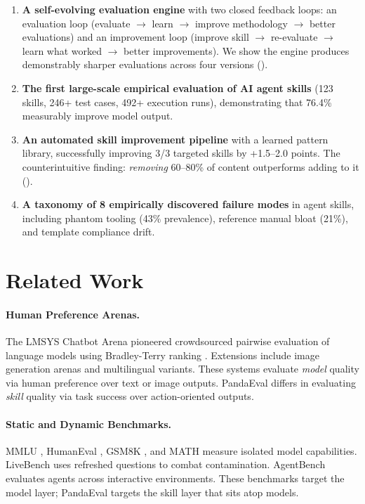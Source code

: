 \documentclass[11pt,a4paper]{article}
\begin{document}
\begin{enumerate}[leftmargin=*]
    \item \textbf{A self-evolving evaluation engine} with two closed feedback loops: an evaluation loop (evaluate $\rightarrow$ learn $\rightarrow$ improve methodology $\rightarrow$ better evaluations) and an improvement loop (improve skill $\rightarrow$ re-evaluate $\rightarrow$ learn what worked $\rightarrow$ better improvements). We show the engine produces demonstrably sharper evaluations across four versions ().
    \item \textbf{The first large-scale empirical evaluation of AI agent skills} (123 skills, 246+ test cases, 492+ execution runs), demonstrating that 76.4\% measurably improve model output.
    \item \textbf{An automated skill improvement pipeline} with a learned pattern library, successfully improving 3/3 targeted skills by +1.5--2.0 points. The counterintuitive finding: \emph{removing} 60--80\% of content outperforms adding to it ().
    \item \textbf{A taxonomy of 8 empirically discovered failure modes} in agent skills, including phantom tooling (43\% prevalence), reference manual bloat (21\%), and template compliance drift.
\end{enumerate}

\section{Related Work}
\label{sec:related}

\paragraph{Human Preference Arenas.}
The LMSYS Chatbot Arena \citep{chiang2024chatbot} pioneered crowdsourced pairwise evaluation of language models using Bradley-Terry ranking \citep{bradley1952rank}. Extensions include image generation arenas and multilingual variants. These systems evaluate \emph{model} quality via human preference over text or image outputs. PandaEval differs in evaluating \emph{skill} quality via task success over action-oriented outputs.

\paragraph{Static and Dynamic Benchmarks.}
MMLU \citep{hendrycks2021mmlu}, HumanEval \citep{chen2021humaneval}, GSM8K \citep{cobbe2021gsm8k}, and MATH \citep{hendrycks2021math} measure isolated model capabilities. LiveBench \citep{white2024livebench} uses refreshed questions to combat contamination. AgentBench \citep{liu2023agentbench} evaluates agents across interactive environments. These benchmarks target the model layer; PandaEval targets the skill layer that sits atop models.
\end{document}

